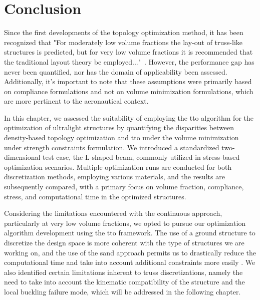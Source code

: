 \section{Conclusion}
Since the first developments of the topology optimization method, it has been recognized that "For moderately low volume fractions the lay-out of truss-like structures is predicted, but for very low volume fractions it is recommended that the traditional layout theory be employed..."~. However, the performance gap has never been quantified, nor has the domain of applicability been assessed. Additionally, it's important to note that these assumptions were primarily based on compliance formulations and not on volume minimization formulations, which are more pertinent to the aeronautical context.

In this chapter, we assessed the suitability of employing the \gls{tto} algorithm for the optimization of ultralight structures by quantifying the disparities between density-based topology optimization and \gls{tto} under the volume minimization under strength constraints formulation. We introduced a standardized two-dimensional test case, the L-shaped beam, commonly utilized in stress-based optimization scenarios. Multiple optimization runs are conducted for both discretization methods, employing various materials, and the results are subsequently compared, with a primary focus on volume fraction, compliance, stress, and computational time in the optimized structures.

Considering the limitations encountered with the continuous approach, particularly at very low volume fractions, we opted to pursue our optimization algorithm development using the \acrfull{tto} framework. The use of a ground structure to discretize the design space is more coherent with the type of structures we are working on, and the use of the \gls{sand} approach permits us to drastically reduce the computational time and take into account additional constraints more easily . We also identified certain limitations inherent to truss discretizations, namely the need to take into account the kinematic compatibility of the structure and the local buckling failure mode, which will be addressed in the following chapter.